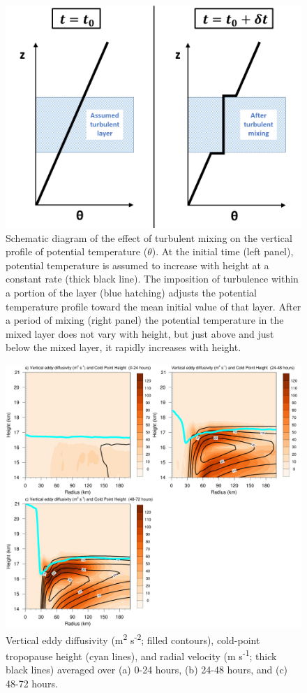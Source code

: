 \documentclass{ametsoc}
\begin{document}
\begin{figure}[ht]
\centerline{\includegraphics[width=39pc]{Schematic2.png}}
   \caption{Schematic diagram of the effect of turbulent mixing on the vertical profile of potential temperature ($\theta$). At the initial time (left panel), potential temperature is assumed to increase with height at a constant rate (thick black line). The imposition of turbulence within a portion of the layer (blue hatching) adjusts the potential temperature profile toward the mean initial value of that layer. After a period of mixing (right panel) the potential temperature in the mixed layer does not vary with height, but just above and just below the mixed layer, it rapidly increases with height.}
\label{fig:schematic}
\end{figure}

\begin{figure}[ht]
\centerline{\includegraphics[width=39pc]{khvten.png}}
\caption{Vertical eddy diffusivity (m\textsuperscript{2} s\textsuperscript{-2}; filled contours), cold-point tropopause height (cyan lines), and radial velocity (m s\textsuperscript{-1}; thick black lines) averaged over (a) 0-24 hours, (b) 24-48 hours, and (c) 48-72 hours.}
\label{fig:diff}
\end{figure}
\end{document}
